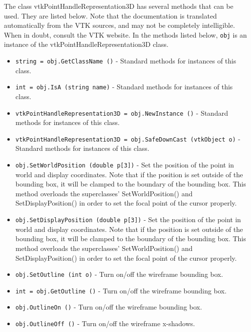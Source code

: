 The class vtkPointHandleRepresentation3D has several methods that can be used.
  They are listed below.
Note that the documentation is translated automatically from the VTK sources,
and may not be completely intelligible.  When in doubt, consult the VTK website.
In the methods listed below, \verb|obj| is an instance of the vtkPointHandleRepresentation3D class.
\begin{itemize}
\item  \verb|string = obj.GetClassName ()| -  Standard methods for instances of this class.

\item  \verb|int = obj.IsA (string name)| -  Standard methods for instances of this class.

\item  \verb|vtkPointHandleRepresentation3D = obj.NewInstance ()| -  Standard methods for instances of this class.

\item  \verb|vtkPointHandleRepresentation3D = obj.SafeDownCast (vtkObject o)| -  Standard methods for instances of this class.

\item  \verb|obj.SetWorldPosition (double p[3])| -  Set the position of the point in world and display coordinates. Note 
 that if the position is set outside of the bounding box, it will be 
 clamped to the boundary of the bounding box. This method overloads
 the superclasses' SetWorldPosition() and SetDisplayPosition() in 
 order to set the focal point of the cursor properly.

\item  \verb|obj.SetDisplayPosition (double p[3])| -  Set the position of the point in world and display coordinates. Note 
 that if the position is set outside of the bounding box, it will be 
 clamped to the boundary of the bounding box. This method overloads
 the superclasses' SetWorldPosition() and SetDisplayPosition() in 
 order to set the focal point of the cursor properly.

\item  \verb|obj.SetOutline (int o)| -  Turn on/off the wireframe bounding box.

\item  \verb|int = obj.GetOutline ()| -  Turn on/off the wireframe bounding box.

\item  \verb|obj.OutlineOn ()| -  Turn on/off the wireframe bounding box.

\item  \verb|obj.OutlineOff ()| -  Turn on/off the wireframe x-shadows.


\end{itemize}
